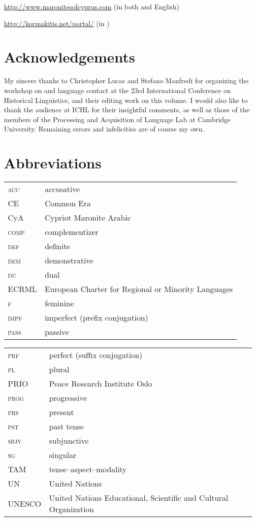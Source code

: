 \documentclass[output=paper]{langsci/langscibook}
\begin{document}
\url{http://www.maronitesofcyprus.com} (in both  and English)


\url{http://kormakitis.net/portal/} (in )



\section*{Acknowledgements}
My sincere thanks to Christopher Lucas and Stefano Manfredi for organizing the workshop on  and language contact at the 23rd International Conference on Historical Linguistics, and their editing work on this volume. I would also like to thank the audience at ICHL for their insightful comments, as well as those of the members of the Processing and Acquisition of Language Lab at Cambridge University. Remaining errors and infelicities are of course my own.



\section*{Abbreviations}
\begin{tabularx}{.5\textwidth}{@{}lQ@{}}
\textsc{acc} & accusative\\
CE & Common Era\\
CyA & Cypriot Maronite Arabic\\
\textsc{comp} & {complementizer}\\
\textsc{def} & {definite}\\
\textsc{dem} & demonstrative\\
\textsc{du} & dual\\
ECRML & European Charter for Regional or Minority Languages\\
\textsc{f} & feminine\\
\textsc{impf} & imperfect (prefix conjugation)\\
\textsc{pass} & {passive}\\
\end{tabularx}%
\begin{tabularx}{.5\textwidth}{@{}lQ@{}}
\textsc{prf} & perfect (suffix conjugation)\\
\textsc{pl} & plural\\
PRIO & Peace Research Institute Oslo\\
\textsc{prog} & progressive \\
\textsc{prs} & present\\
\textsc{pst} & past {tense}\\
\textsc{sbjv} & subjunctive\\
\textsc{sg} & singular\\
TAM & tense--aspect--{modality}\\
UN & United Nations\\
UNESCO & United Nations Educational, Scientific and Cultural Organization
\end{tabularx}%


{\sloppy\printbibliography[heading=subbibliography,notkeyword=this]}
\end{document}
